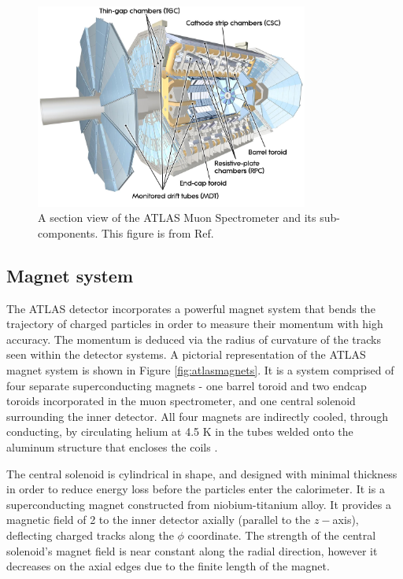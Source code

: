 \begin{figure}
    \centering
    \includegraphics[width=0.8\textwidth]{Figures/LHC/ATLAS_MS.jpeg}
    \caption{A section view of the ATLAS Muon Spectrometer and its sub-components. This figure is from Ref.~\cite{ATLAS_MS}}
    \label{fig:muonspectrometer}
\end{figure}
\subsection{Magnet system}

The ATLAS detector incorporates a powerful magnet system that bends the trajectory of charged particles in order to measure their momentum with high accuracy. The momentum is deduced via the radius of curvature of the tracks seen within the detector systems. A pictorial representation of the ATLAS magnet system is shown in Figure \ref{fig:atlasmagnets}. It is a system comprised of four separate superconducting magnets - one barrel toroid and two endcap toroids incorporated in the muon spectrometer, and one central solenoid surrounding the inner detector. All four magnets are indirectly cooled, through conducting, by circulating helium at 4.5 K in the tubes welded onto the aluminum structure that encloses the coils \cite{828245}. 

The central solenoid is cylindrical in shape, and designed with minimal thickness in order to reduce energy loss before the particles enter the calorimeter. It is a superconducting magnet constructed from niobium-titanium alloy. It provides a magnetic field of \unit{2}{\tesla} to the inner detector axially (parallel to the $z-$axis), deflecting charged tracks along the $\phi$ coordinate. The strength of the central solenoid's magnet field is near constant along the radial direction, however it decreases on the axial edges due to the finite length of the magnet. 

